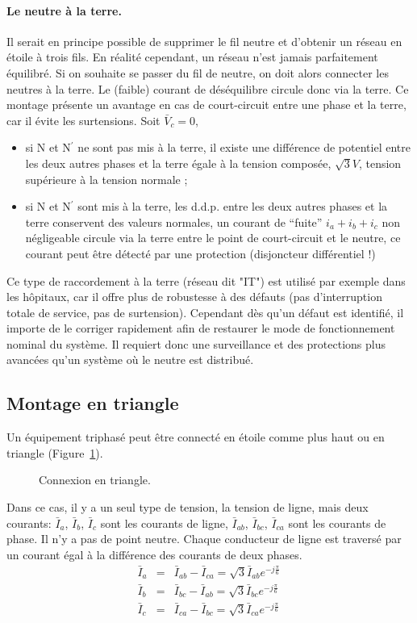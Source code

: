 \paragraph{Le neutre à la terre.}
Il serait en principe possible de supprimer le fil neutre et d'obtenir un réseau en étoile à trois fils. En réalité cependant, un réseau n'est jamais parfaitement équilibré. Si on souhaite se passer du fil de neutre, on doit alors connecter les neutres à la terre. Le (faible) courant de déséquilibre circule donc via la terre.
Ce montage présente un avantage en cas de court-circuit entre une phase et la terre, car il  évite les surtensions. Soit $\bar{V}_c=0$, 
\begin{itemize}
	\item si N et N$^{'}$ ne sont pas mis à la terre, il existe une 
	différence de potentiel entre les deux autres phases et la terre égale à la tension composée, $\sqrt{3}V$, tension supérieure à la tension normale ;
	\item si N et N$^{'}$ sont mis à la terre, les d.d.p. entre les deux autres phases et la terre conservent des valeurs normales,
	un courant de ``fuite'' $i_a+i_b+i_c$ non
	négligeable circule via la terre entre le point de court-circuit et
	le neutre, ce courant peut être détecté par une protection (disjoncteur différentiel !)
\end{itemize}
Ce type de raccordement à la terre (réseau dit "IT") est utilisé par exemple dans les hôpitaux, car il offre plus de robustesse à des défauts (pas d'interruption totale de service, pas de surtension). Cependant dès qu'un défaut est identifié, il importe de le corriger rapidement afin de restaurer le mode de fonctionnement nominal du système. Il requiert donc une surveillance et des protections plus avancées qu'un système où le neutre est distribué.

\subsection{Montage en triangle}

Un équipement triphasé peut être connecté en étoile comme plus haut ou
en triangle (Figure~\ref{fig:triangle}).
\begin{figure}[hb]
	\centering
	
	\caption{Connexion en triangle.\label{fig:triangle}}
\end{figure}
Dans ce cas, il y a un seul type de tension, la tension de ligne,  mais  deux courants:
$\bar{I}_a$, $\bar{I}_b$, $\bar{I}_c$ sont les courants de ligne,
$\bar{I}_{ab}$, $\bar{I}_{bc}$, $\bar{I}_{ca}$ sont les courants de phase.
Il n'y a pas de point neutre.
Chaque conducteur de ligne est traversé par un courant égal à la différence des courants de deux phases.
\begin{eqnarray*}
	\bar{I}_{a}& =&
	\bar{I}_{ab}-\bar{I}_{ca}=\sqrt{3}\bar{I}_{ab}e^{-j\frac{\pi}{6}}\\
	\bar{I}_{b}& =& \bar{I}_{bc}-\bar{I}_{ab}=\sqrt{3}\bar{I}_{bc}e^{-j\frac{\pi}{6}}\\
	\bar{I}_{c}& =& \bar{I}_{ca}-\bar{I}_{bc}=\sqrt{3}\bar{I}_{ca}e^{-j\frac{\pi}{6}}\
\end{eqnarray*}


